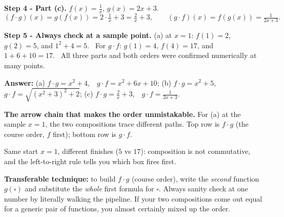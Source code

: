 \documentclass[11pt,a4paper]{article}
\newcommand{\answer}[1]{\begin{answerbox}\centering\textbf{Answer:}\quad #1\end{answerbox}}
\begin{document}
\textbf{Step 4 - Part (c).} $f(x)=\tfrac1x$, $g(x)=2x+3$.
\[
(f\cdot g)(x)=g(f(x))=2\cdot\tfrac1x+3=\tfrac2x+3,\qquad
(g\cdot f)(x)=f(g(x))=\tfrac{1}{2x+3}.
\]

\textbf{Step 5 - Always check at a sample point.} (a) at $x=1$: $f(1)=2$, $g(2)=5$, and
$1^2+4=5$. \checkmark\ For $g\cdot f$: $g(1)=4$, $f(4)=17$, and $1+6+10=17$. \checkmark\ All three
parts and both orders were confirmed numerically at many points.

\answer{%
(a) $f\cdot g=x^2+4$,\ \ $g\cdot f=x^2+6x+10$;\quad
(b) $f\cdot g=x^2+5$,\ \ $g\cdot f=\sqrt{(x^2+3)^2+2}$;\quad
(c) $f\cdot g=\tfrac2x+3$,\ \ $g\cdot f=\tfrac1{2x+3}$.}

\medskip
\textbf{The arrow chain that makes the order unmistakable.} For (a) at the sample $x=1$, the two
compositions trace different paths. Top row is $f\cdot g$ (the course order, $f$ first); bottom row
is $g\cdot f$.

\begin{center}
\end{center}
Same start $x=1$, different finishes ($5$ vs $17$): composition is not commutative, and the
left-to-right rule tells you which box fires first.

\begin{methodbox}
\textbf{Transferable technique:} to build $f\cdot g$ (course order), write the \emph{second}
function $g(\square)$ and substitute the \emph{whole} first formula for $\square$. Always sanity
check at one number by literally walking the pipeline. If your two compositions come out equal for
a generic pair of functions, you almost certainly mixed up the order.
\end{methodbox}
\end{document}
